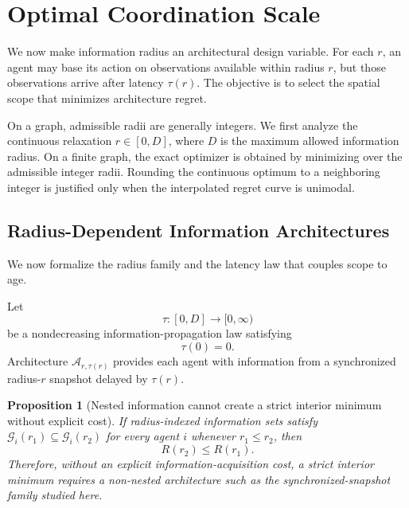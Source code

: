 \documentclass[11pt]{article}
\newtheorem{proposition}{Proposition}
\begin{document}
\section{Optimal Coordination Scale}
\label{sec:optimal_coordination_scale}

We now make information radius an architectural design variable. For each
$r$, an agent may base its action on observations available within radius $r$,
but those observations arrive after latency $\tau(r)$. The objective is to
select the spatial scope that minimizes architecture regret.

On a graph, admissible radii are generally integers. We first analyze the
continuous relaxation $r\in[0,D]$, where $D$ is the maximum allowed
information radius. On a finite graph, the exact optimizer is obtained by
minimizing over the admissible integer radii. Rounding the continuous optimum
to a neighboring integer is justified only when the interpolated regret curve
is unimodal.

\subsection{Radius-Dependent Information Architectures}
\label{subsec:radius_dependent_architectures}

We now formalize the radius family and the latency law that couples scope to
age.

Let
\begin{equation}
    \tau:
    [0,D]
    \rightarrow
    [0,\infty)
    \label{eq:latency_function_domain}
\end{equation}
be a nondecreasing information-propagation law satisfying
\begin{equation}
    \tau(0)=0.
    \label{eq:tau_zero}
\end{equation}
Architecture $\mathcal{A}_{r,\tau(r)}$ provides each agent with information
from a synchronized radius-$r$ snapshot delayed by $\tau(r)$.

\begin{proposition}[Nested information cannot create a strict interior minimum without explicit cost]
\label{prop:nested_radius_monotonicity}
If radius-indexed information sets satisfy
$\mathcal G_i(r_1)\subseteq\mathcal G_i(r_2)$ for every agent $i$ whenever
$r_1\le r_2$, then
\begin{equation}
R(r_2)\le R(r_1).
\end{equation}
Therefore, without an explicit information-acquisition cost, a strict interior
minimum requires a non-nested architecture such as the synchronized-snapshot
family studied here.
\end{proposition}
\end{document}
